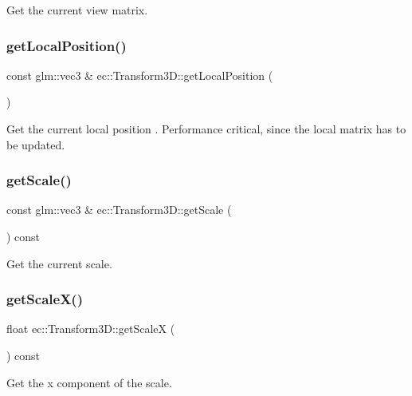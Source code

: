 Get the current view matrix. \mbox{\label{classec_1_1_transform3_d_a69ce5285f9481b5615c084b9f892fdb8}} 
\subsubsection{\texorpdfstring{get\+Local\+Position()}{getLocalPosition()}}
{\footnotesize\ttfamily const glm\+::vec3 \& ec\+::\+Transform3\+D\+::get\+Local\+Position (\begin{DoxyParamCaption}{ }\end{DoxyParamCaption})}

Get the current local position . Performance critical, since the local matrix has to be updated. \mbox{\label{classec_1_1_transform3_d_ab5f0e26d19bbb99a4624784d3024e654}} 
\subsubsection{\texorpdfstring{get\+Scale()}{getScale()}}
{\footnotesize\ttfamily const glm\+::vec3 \& ec\+::\+Transform3\+D\+::get\+Scale (\begin{DoxyParamCaption}{ }\end{DoxyParamCaption}) const}

Get the current scale. \mbox{\label{classec_1_1_transform3_d_a7ecc00577cd57f15ed63926a712cdcb1}} 
\subsubsection{\texorpdfstring{get\+Scale\+X()}{getScaleX()}}
{\footnotesize\ttfamily float ec\+::\+Transform3\+D\+::get\+ScaleX (\begin{DoxyParamCaption}{ }\end{DoxyParamCaption}) const}

Get the x component of the scale. \mbox{\label{classec_1_1_transform3_d_a99763688e60bc36134390327344f5df0}} 
